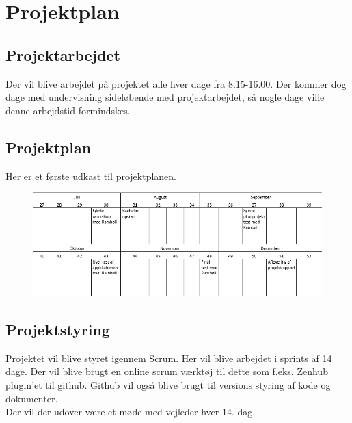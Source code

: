 
	\chapter{Projektplan}
	
	\section{Projektarbejdet}
	Der vil blive arbejdet på projektet alle hver dage fra 8.15-16.00. Der kommer dog dage med undervisning sideløbende med projektarbejdet, så nogle dage ville denne arbejdstid formindskes. \\
	
	\section{Projektplan}
	Her er et første udkast til projektplanen.
	\begin{figure}[h!]
		\centering
		\includegraphics[width=0.9\linewidth]{Projektplan/Projektplan}
	\end{figure}

	\section{Projektstyring}

	Projektet vil blive styret igennem Scrum. Her vil blive arbejdet i sprints af 14 dage. Der vil blive brugt en online scrum værktøj til dette som f.eks. Zenhub plugin'et til github. Github vil også blive brugt til versions styring af kode og dokumenter. \\
	Der vil der udover være et møde med vejleder hver 14. dag. \\

	
